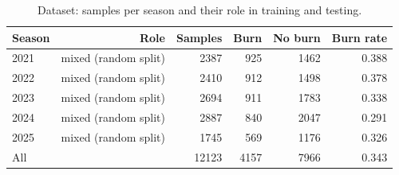 \begin{table}[t]
\centering
\caption{Dataset: samples per season and their role in training and testing.}
\label{tab:table1_dataset}
\begin{tabular}{lrrrrr}
\hline
Season & Role & Samples & Burn & No burn & Burn rate \\
\hline
2021 & mixed (random split) & 2387 & 925 & 1462 & 0.388 \\
2022 & mixed (random split) & 2410 & 912 & 1498 & 0.378 \\
2023 & mixed (random split) & 2694 & 911 & 1783 & 0.338 \\
2024 & mixed (random split) & 2887 & 840 & 2047 & 0.291 \\
2025 & mixed (random split) & 1745 & 569 & 1176 & 0.326 \\
All &  & 12123 & 4157 & 7966 & 0.343 \\
\hline
\end{tabular}
\end{table}
